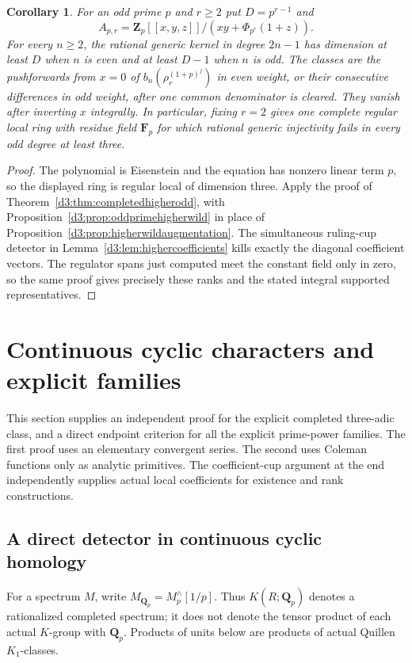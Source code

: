 \documentclass[11pt,a4paper]{amsart}
\numberwithin{equation}{section}
\newtheorem{corollary}[theorem]{Corollary}
\theoremstyle{definition}
\theoremstyle{remark}
\newcommand{\Z}{\mathbf Z}
\newcommand{\F}{\mathbf F}
\begin{document}
\begin{corollary}
\label{d3:cor:oddprimecompletedhigher}
For an odd prime $p$ and $r\geq2$ put $D=p^{r-1}$ and
\[
 A_{p,r}=\Z_p[[x,y,z]]/(xy+\Phi_{p^r}(1+z)).
\]
For every $n\geq2$, the rational generic kernel in degree $2n-1$
has dimension at least $D$ when $n$ is even and at least $D-1$
when $n$ is odd. The classes are the pushforwards from $x=0$ of
$b_n(\rho_r^{(1+p)^j})$ in even weight, or their consecutive
differences in odd weight, after one common denominator is cleared.
They vanish after inverting $x$ integrally.
In particular, fixing $r=2$ gives one complete regular local ring
with residue field $\F_p$ for which rational generic injectivity
fails in every odd degree at least three.
\end{corollary}
\begin{proof}
The polynomial is Eisenstein and the equation has nonzero linear
term $p$, so the displayed ring is regular local of dimension three.
Apply the proof of Theorem~\ref{d3:thm:completedhigherodd}, with
Proposition~\ref{d3:prop:oddprimehigherwild} in place of
Proposition~\ref{d3:prop:higherwildaugmentation}.
The simultaneous ruling-cup detector in
Lemma~\ref{d3:lem:highercoefficients} kills exactly the diagonal
coefficient vectors. The regulator spans just computed meet the
constant field only in zero, so the same proof gives precisely
these ranks and the stated integral supported representatives.
\end{proof}

\section{Continuous cyclic characters and explicit families}\label{d3:sec:directcyclic}

This section supplies an independent proof for the explicit completed
three-adic class, and a direct endpoint criterion for all the explicit
prime-power families. The first proof uses an elementary convergent
series. The second uses Coleman functions only as analytic primitives.
The coefficient-cup argument at the end independently supplies actual
local coefficients for existence and rank constructions.

\subsection{A direct detector in continuous cyclic homology}
\label{d3:sec:directtcdetector}

For a spectrum $M$, write $M_{\mathbf Q_p}=M^{\wedge}_p[1/p]$.
Thus $K(R;\mathbf Q_p)$ denotes a rationalized completed spectrum;
it does not denote the tensor product of each actual $K$-group with
$\mathbf Q_p$. Products of units below are products of actual
Quillen $K_1$-classes.
\end{document}
